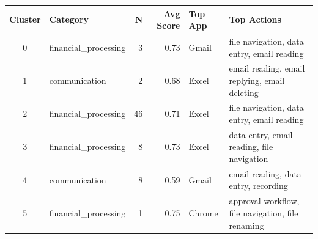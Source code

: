 \begin{tabular}{clrrll}
\toprule
\textbf{Cluster} & \textbf{Category} & \textbf{N} & \textbf{Avg Score} & \textbf{Top App} & \textbf{Top Actions} \\
\midrule
0 & financial\_processing & 3 & 0.73 & Gmail & file navigation, data entry, email reading \\
1 & communication & 2 & 0.68 & Excel & email reading, email replying, email deleting \\
2 & financial\_processing & 46 & 0.71 & Excel & file navigation, data entry, email reading \\
3 & financial\_processing & 8 & 0.73 & Excel & data entry, email reading, file navigation \\
4 & communication & 8 & 0.59 & Gmail & email reading, data entry, recording \\
5 & financial\_processing & 1 & 0.75 & Chrome & approval workflow, file navigation, file renaming \\
\bottomrule
\end{tabular}